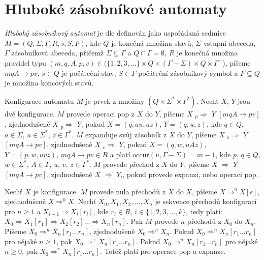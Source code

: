 \section{Hluboké zásobníkové automaty}


\begin{Def} \label{def_deep_pda}
\emph{Hluboký zásobníkový automat} je dle \cite{Meduna:DeepPDA} definován jako uspořádaná sedmice $M = (Q,\Sigma,\Gamma, R, s, S, F)$, kde 
  $Q$ je konečná množina stavů, 
  $\Sigma$ vstupní abeceda, 
  $\Gamma$ zásobníková abeceda, přičemž $\Sigma \subseteq \Gamma$ a $Q \cap \Gamma = \emptyset$,
  $R$ je konečná množina pravidel typu $(m, q, A, p, v) \in (\{1,2,3,\dots\} \times Q \times (\Gamma-\Sigma)\times   Q \times {\Gamma}^+$), píšeme $mqA \rightarrow pv$,
  $s \in Q$ je počáteční stav, 
  $S \in \Gamma$ počáteční zásobníkový symbol a 
  $F \subseteq Q$ je množina koncových stavů.

Konfigurace automatu $M$ je prvek z množiny $(Q \times \Sigma^* \times \Gamma^*)$. 
Nechť $X$, $Y$ jsou dvě konfigurace. 
$M$ provede operaci pop z $X$ do $Y$, píšeme $X$  ${}_p{\Rightarrow}$  $Y$ $[mqA \rightarrow pv]$, zjednodušeně $X$  ${}_p{\Rightarrow}$  $Y$, pokud $X = (q, au, az)$, $Y = (q, u, z)$, kde $q \in Q$, $a \in \Sigma$, $u \in \Sigma^*$, $z \in \Gamma^*$.  
$M$ expanduje svůj zásobník z $X$ do $Y$, píšeme $X$  ${}_e{\Rightarrow}$  $Y$ $[mqA \rightarrow pv]$, zjednodušeně $X$  ${}_e{\Rightarrow}$  $Y$, pokud $X = (q, w, uAz)$, $Y = (p, w, uvz)$, $mqA \rightarrow pv \in R$ a platí $\mathrm{occur}(u,\Gamma - \Sigma) = m - 1 $, kde $p$, $q \in Q$, $w \in \Sigma^*$, $A \in \Gamma$, $u$, $v$, $z \in \Gamma^*$. 
$M$ provede přechod z $X$ do $Y$, píšeme $X$  ${\Rightarrow}$  $Y$ $[mqA \rightarrow pv]$, zjednodušeně $X$  ${\Rightarrow}$  $Y$,, pokud provede expanzi, nebo operaci pop.

Nechť $X$ je konfigurace. $M$ provede nula přechodů z $X$ do $X$, píšeme $X \Rightarrow^0 X [\epsilon]$, zjednodušeně $X \Rightarrow^0 X$. Nechť $X_0, X_1, X_2,\dots,X_n $ je sekvence přechodů konfigurací pro $n \ge 1$  a $X_{i-1} \Rightarrow X_i [r_i]$, kde $r_i \in R$, $i \in \{1, 2, 3,\dots, k\}$, tedy platí: $X_0 \Rightarrow X_1 [r_1] \Rightarrow X_2 [r_2] \dots \Rightarrow X_n [r_n]$. Pak $M$ provede $n$ přechodů z $X_0$ do $X_n$. Píšeme $X_{0} \Rightarrow^n X_n [r_1 \dots r_n]$, zjednodušeně $X_{0} \Rightarrow^n X_n$. Pokud $X_{0} \Rightarrow^n X_n [r_1 \dots r_n]$ pro nějaké $n \ge 1$, pak $X_{0} \Rightarrow^+ X_n [r_1 \dots r_n]$. Pokud $X_{0} \Rightarrow^n X_n [r_1 \dots r_n]$ pro nějaké $n \ge 0$, pak $X_{0} \Rightarrow^* X_n [r_1 \dots r_n]$. Totéž platí pro operace pop a expanze.


\end{Def}

